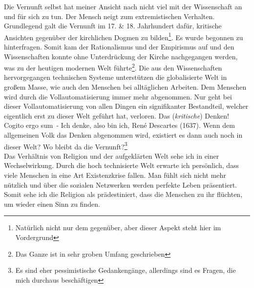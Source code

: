 Die Vernunft selbst hat meiner Ansicht nach nicht viel mit der Wissenschaft an und für sich zu tun. Der Mensch neigt zum extremistischen Verhalten. Grundlegend galt die Vernunft im 17. \& 18. Jahrhundert dafür, kritische Ansichten gegenüber der kirchlichen Dogmen zu bilden\footnote{Natürlich nicht nur dem gegenüber, aber dieser Aspekt steht hier im Vordergrund}. Es wurde begonnen zu hinterfragen. Somit kam der Rationalismus und der Empirismus auf und den Wissenschaften konnte ohne Unterdrückung der Kirche nachgegangen werden, was zu der heutigen modernen Welt führte\footnote{Das Ganze ist in sehr groben Umfang geschrieben}. Die aus den Wissenschaften hervorgegangen technischen Systeme unterstützen die globalisierte Welt in großem Masse, wie auch den Menschen bei alltäglichen Arbeiten. Dem Menschen wird durch die Vollautomatisierung immer mehr abgenommen. Nur geht bei dieser Vollautomatisierung von allen Dingen ein signifikanter Bestandteil, welcher eigentlich erst zu dieser Welt geführt hat, verloren. Das (\textit{kritische}) Denken! \glqq Cogito ergo sum\grqq\, - \glqq Ich denke, also bin ich\grqq, René Descartes (1637). Wenn dem allgemeinen Volk das Denken abgenommen wird, existiert es dann auch noch in dieser Welt? Wo bleibt da die Vernunft?\footnote{Es sind eher pessimistische Gedankengänge, allerdings sind es Fragen, die mich durchaus beschäftigen}\\

Das Verhältnis von Religion und der aufgeklärten Welt sehe ich in einer Wechselwirkung. Durch die hoch technisierte Welt erwarte ich persönlich, dass viele Menschen in eine Art Existenzkrise fallen. Man fühlt sich nicht mehr nützlich und über die sozialen Netzwerken werden perfekte Leben präsentiert. Somit sehe ich die Religion als prädestiniert, dass die Menschen zu ihr \glqq flüchten\grqq, um wieder einen Sinn zu finden.\\